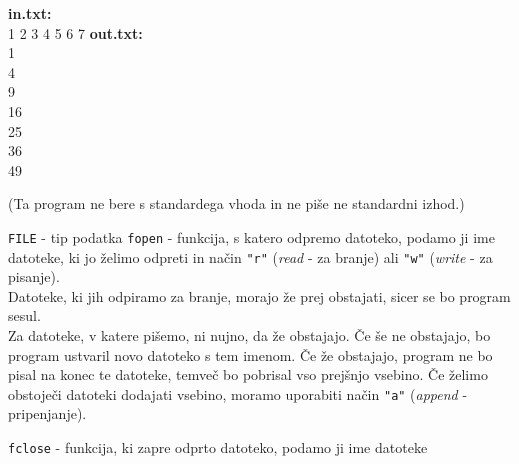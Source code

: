 \begin{examples}


\begin{inout}
{\color{blue} \bf in.txt:} \\
1 2 3 4 5 6 7
\tcblower
{\color{blue} \bf out.txt:} \\
1\\
4\\
9\\
16\\
25\\
36\\
49
\end{inout}

(Ta program ne bere s standardega vhoda in ne piše ne standardni izhod.)
\end{examples}

\verb+FILE+ - tip podatka
\verb+fopen+ - funkcija, s katero odpremo datoteko, podamo ji ime datoteke, ki
jo želimo odpreti in način \verb+"r"+ (\emph{read} - za branje) ali \verb+"w"+
(\emph{write} - za pisanje).\\ Datoteke, ki jih odpiramo za branje, morajo že
prej obstajati, sicer se bo program sesul. \\

Za datoteke, v katere pišemo, ni nujno, da že obstajajo. Če še ne obstajajo, bo
program ustvaril novo datoteko s tem imenom. Če že obstajajo, program ne bo
pisal na konec te datoteke, temveč bo pobrisal vso prejšnjo vsebino.
Če želimo obstoječi datoteki dodajati vsebino, moramo uporabiti način
\verb+"a"+ (\emph{append} - pripenjanje).

\verb+fclose+ - funkcija, ki zapre odprto datoteko, podamo ji ime datoteke

